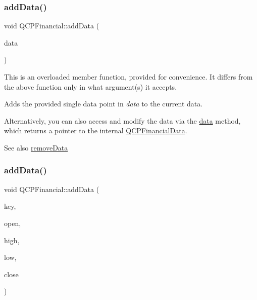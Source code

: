 \subsubsection{\texorpdfstring{add\+Data()}{addData()}\hspace{0.1cm}{\footnotesize\ttfamily [2/4]}}
{\footnotesize\ttfamily void Q\+C\+P\+Financial\+::add\+Data (\begin{DoxyParamCaption}\item[{const \mbox{\hyperlink{class_q_c_p_financial_data}{Q\+C\+P\+Financial\+Data}} \&}]{data }\end{DoxyParamCaption})}

This is an overloaded member function, provided for convenience. It differs from the above function only in what argument(s) it accepts.

Adds the provided single data point in {\itshape data} to the current data.

Alternatively, you can also access and modify the data via the \mbox{\hyperlink{class_q_c_p_financial_a528c81578e4f25999a9169127763cfd4}{data}} method, which returns a pointer to the internal \mbox{\hyperlink{class_q_c_p_financial_data}{Q\+C\+P\+Financial\+Data}}.

\begin{DoxySeeAlso}{See also}
\mbox{\hyperlink{class_q_c_p_financial_a048c741d3c8cc5709c2c44b759fdf27c}{remove\+Data}} 
\end{DoxySeeAlso}
\mbox{\label{class_q_c_p_financial_a688bbd052e00a02954ddb0068b378170}} 
\subsubsection{\texorpdfstring{add\+Data()}{addData()}\hspace{0.1cm}{\footnotesize\ttfamily [3/4]}}
{\footnotesize\ttfamily void Q\+C\+P\+Financial\+::add\+Data (\begin{DoxyParamCaption}\item[{double}]{key,  }\item[{double}]{open,  }\item[{double}]{high,  }\item[{double}]{low,  }\item[{double}]{close }\end{DoxyParamCaption})}


